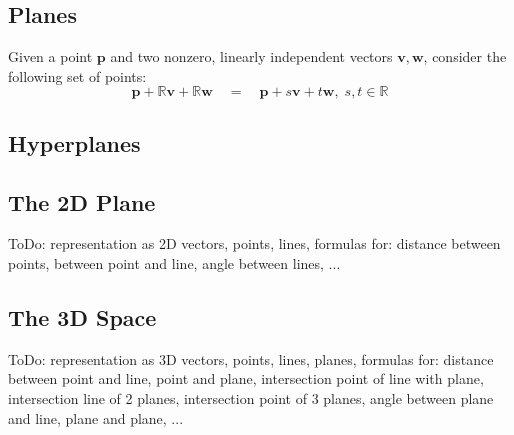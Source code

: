 \subsection{Planes}
Given a point $\mathbf{p}$ and two nonzero, linearly independent vectors $\mathbf{v, w}$, consider the following set of points:
\begin{equation}
 \mathbf{p} + \mathbb{R} \mathbf{v}  + \mathbb{R} \mathbf{w}
 \quad = \quad
 \mathbf{p} + s \mathbf{v} + t \mathbf{w}, \; s,t \in \mathbb{R}
\end{equation}



\subsection{Hyperplanes}


\subsection{The 2D Plane}

ToDo: representation as 2D vectors, points, lines, formulas for: distance between points, between point and line, angle between lines, ...



\subsection{The 3D Space}

ToDo: representation as 3D vectors, points, lines, planes, formulas for: distance between point and line, point and plane, intersection point of line with plane, intersection line of 2 planes, intersection point of 3 planes, angle between plane and line, plane and plane, ...


\begin{comment}


Geometrische Interpretation linearer Abbildungen
https://www.youtube.com/watch?v=EQ5Xct2YyLk


Weitz: Analytische Geometrie
https://www.youtube.com/watch?v=7rkkHIjHtNI
https://www.youtube.com/watch?v=7rkkHIjHtNI&list=PLb0zKSynM2PBYzz6l37rWH3B_n_7P40QP

\end{comment}